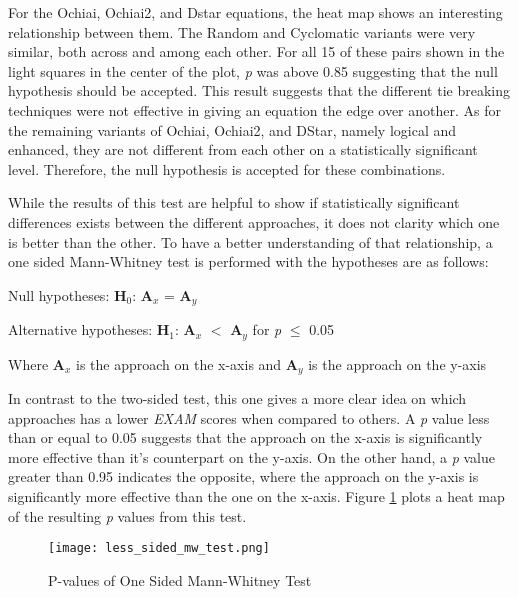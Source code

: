 For the Ochiai, Ochiai2, and Dstar equations, the heat map shows an interesting
relationship between them. The Random and Cyclomatic variants were very similar,
both across and among each other. For all 15 of these pairs shown in the light
squares in the center of the plot,
\emph{p} was above 0.85 suggesting that the null hypothesis should be accepted.
This result suggests that the different tie breaking techniques were not
effective in giving an equation the edge over another.
As for the remaining variants of Ochiai, Ochiai2, and DStar, namely logical and
enhanced, they are not different from each other on a statistically significant
level. Therefore, the null hypothesis is accepted for these combinations.

While the results of this test are helpful to show if statistically significant
differences exists between the different approaches, it does not clarity which
one is better than the other. To have a better understanding of that
relationship, a one sided  Mann-Whitney test is performed with the
hypotheses are as follows:

\begin{center}
    Null hypotheses: \textbf{H$_{0}$}: \textbf{A$_{x}$} = \textbf{A$_{y}$}

    Alternative hypotheses: \textbf{H$_{1}$}: \textbf{A$_{x}$} $<$
    \textbf{A$_{y}$}
    for \emph{p} $\leq$  0.05

    Where \textbf{A$_{x}$} is the approach on the x-axis and \textbf{A$_{y}$} is
    the approach on the y-axis
\end{center}

In contrast to the two-sided test, this one gives a more clear idea on which
approaches has a lower \emph{EXAM} scores when compared to others. A \emph{p}
value less than or equal to 0.05 suggests that the approach on the x-axis is
significantly more effective than it's counterpart on the y-axis. On the other
hand, a \emph{p} value greater than 0.95 indicates the opposite, where the
approach on the y-axis is significantly more effective than the one on the x-axis. Figure
\ref{fig:one_sided_mw_test} plots a heat map of the resulting \emph{p} values
from this test.

\begin{figure}[!htb]
	\begin{center}
		\texttt{[image: less\_sided\_mw\_test.png]}
        \caption{\label{fig:one_sided_mw_test} P-values of One Sided Mann-Whitney Test}
	\end{center}
\end{figure}

